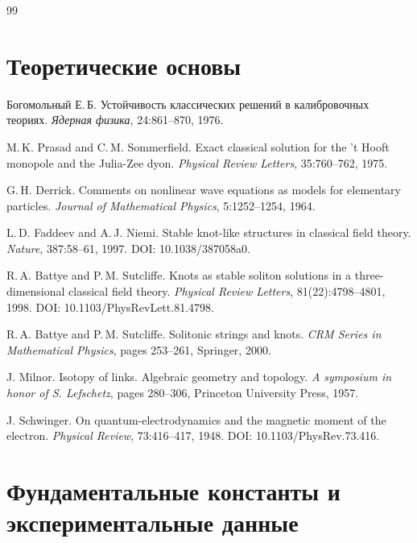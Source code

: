 \documentclass[12pt,a4paper]{article}
\begin{document}
\begin{thebibliography}{99}
	
	\section*{Теоретические основы}
	
	Богомольный Е.\,Б.
	\newblock Устойчивость классических решений в калибровочных теориях.
	\newblock \textit{Ядерная физика}, 24:861--870, 1976.
	
	M.\,K. Prasad and C.\,M. Sommerfield.
	\newblock Exact classical solution for the 't Hooft monopole and the Julia-Zee dyon.
	\newblock \textit{Physical Review Letters}, 35:760--762, 1975.
	
	G.\,H. Derrick.
	\newblock Comments on nonlinear wave equations as models for elementary particles.
	\newblock \textit{Journal of Mathematical Physics}, 5:1252--1254, 1964.
	
	L.\,D. Faddeev and A.\,J. Niemi.
	\newblock Stable knot-like structures in classical field theory.
	\newblock \textit{Nature}, 387:58--61, 1997.
	\newblock DOI: 10.1038/387058a0.
	
	R.\,A. Battye and P.\,M. Sutcliffe.
	\newblock Knots as stable soliton solutions in a three-dimensional classical field theory.
	\newblock \textit{Physical Review Letters}, 81(22):4798--4801, 1998.
	\newblock DOI: 10.1103/PhysRevLett.81.4798.
	
	R.\,A. Battye and P.\,M. Sutcliffe.
	\newblock Solitonic strings and knots.
	\newblock \textit{CRM Series in Mathematical Physics}, pages 253--261, Springer, 2000.
	
	J. Milnor.
	\newblock Isotopy of links. Algebraic geometry and topology.
	\newblock \textit{A symposium in honor of S. Lefschetz}, pages 280--306, Princeton University Press, 1957.
	
	J. Schwinger.
	\newblock On quantum-electrodynamics and the magnetic moment of the electron.
	\newblock \textit{Physical Review}, 73:416--417, 1948.
	\newblock DOI: 10.1103/PhysRev.73.416.
	
	\section*{Фундаментальные константы и экспериментальные данные}
	

\end{thebibliography}
\end{document}
